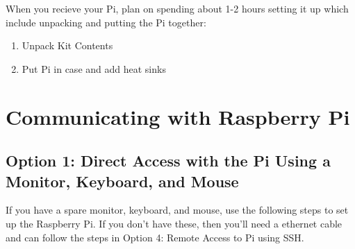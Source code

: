 \documentclass{article}\usepackage[]{graphicx}\usepackage[]{color}
\begin{document}
When you recieve your Pi, plan on spending about 1-2 hours setting it up which include unpacking and putting the Pi together: 

\begin{enumerate}

\item Unpack Kit Contents

\item Put Pi in case and add heat sinks

\end{enumerate}

\section{Communicating with Raspberry Pi}

\subsection{Option 1: Direct Access with the Pi Using a Monitor, Keyboard, and Mouse}

If you have a spare monitor, keyboard, and mouse, use the following steps to set up the Raspberry Pi. If you don't have these, then you'll need a ethernet cable and can follow the steps in Option 4: Remote Access to Pi using SSH. 
\end{document}
